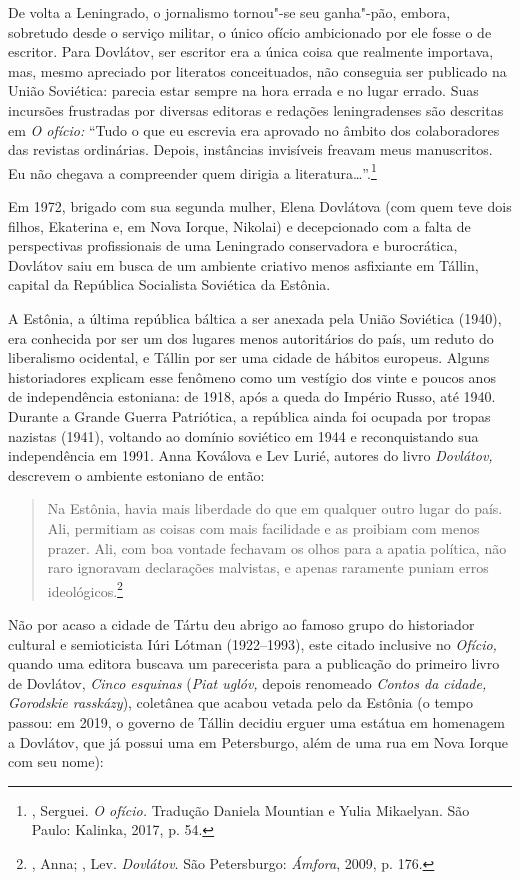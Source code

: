 De volta a Leningrado, o jornalismo tornou"-se seu ganha"-pão, embora,
sobretudo desde o serviço militar, o único ofício ambicionado por ele
fosse o de escritor. Para Dovlátov, ser escritor era a única coisa que
realmente importava, mas, mesmo apreciado por literatos conceituados,
não conseguia ser publicado na União Soviética: parecia estar sempre na
hora errada e no lugar errado. Suas incursões frustradas por diversas
editoras e redações leningradenses são descritas em \emph{O ofício:}
``Tudo o que eu escrevia era aprovado no âmbito dos colaboradores das
revistas ordinárias. Depois, instâncias invi­síveis freavam meus
manuscritos. Eu não chegava a compreen­der quem dirigia a
literatura\ldots{}''.\footnote{, Serguei. \emph{O ofício.} Tradução
  Daniela Mountian e Yulia Mikaelyan. São Paulo: Kalinka, 2017, p. 54.}

Em 1972, brigado com sua segunda mulher, Elena Dovlátova (com quem teve
dois filhos, Ekaterina e, em Nova Iorque, Nikolai) e decepcionado com a
falta de perspectivas profissionais de uma Leningrado conservadora e
burocrática, Dovlátov saiu em busca de um ambiente criativo
menos asfixiante em Tállin, capital da República Socialista Soviética da
Estônia.

A Estônia, a última república báltica a ser anexada pela União Soviética
(1940), era conhecida por ser um dos lugares menos autoritários do país,
um reduto do liberalismo ocidental, e Tállin por ser uma cidade de
hábitos europeus. Alguns historiadores explicam esse fenômeno como um
vestígio dos vinte e poucos anos de independência estoniana: de 1918,
após a queda do Império Russo, até 1940. Durante a Grande Guerra
Patriótica, a república ainda foi ocupada por tropas nazistas (1941),
voltando ao domínio soviético em 1944 e reconquistando sua independência
em 1991. Anna Koválova e Lev Lurié, autores do livro \emph{Dovlátov,}
descrevem o ambiente estoniano de então:

\begin{quotation}
Na Estônia, havia mais liberdade do que em qualquer outro lugar do país.
Ali, permitiam as coisas com mais facilidade e as proibiam com menos
prazer. Ali, com boa vontade fechavam os olhos para a apatia política,
não raro ignoravam declarações malvistas, e apenas raramente puniam
erros ideológicos.\footnote{, Anna; , Lev. \emph{Dovlátov}.
  São Petersburgo: \emph{Ámfora}, 2009, p. 176.}
\end{quotation}

Não por acaso a cidade de Tártu deu abrigo ao famoso grupo do
historiador cultural e semioticista Iúri Lótman (1922--1993), este
citado inclusive no \emph{Ofício,} quando uma editora buscava um
parecerista para a publicação do primeiro livro de Dovlátov, \emph{Cinco
esquinas} (\emph{Piat uglóv,} depois renomeado \emph{Contos da cidade,
Gorodskie rasskázy}), coletânea que acabou vetada pelo  da
Estônia (o tempo passou: em 2019, o governo de Tállin decidiu erguer uma
estátua em homenagem a Dovlátov, que já possui uma em Petersburgo, além
de uma rua em Nova Iorque com seu nome):

